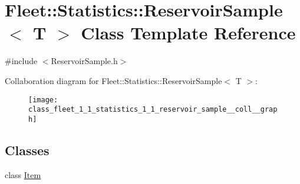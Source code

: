 \hypertarget{class_fleet_1_1_statistics_1_1_reservoir_sample}{}\section{Fleet\+:\+:Statistics\+:\+:Reservoir\+Sample$<$ T $>$ Class Template Reference}
\label{class_fleet_1_1_statistics_1_1_reservoir_sample}


{\ttfamily \#include $<$Reservoir\+Sample.\+h$>$}



Collaboration diagram for Fleet\+:\+:Statistics\+:\+:Reservoir\+Sample$<$ T $>$\+:
\nopagebreak
\begin{figure}[H]
\begin{center}
\leavevmode
\texttt{[image: class\_fleet\_1\_1\_statistics\_1\_1\_reservoir\_sample\_\_coll\_\_graph]}
\end{center}
\end{figure}
\subsection*{Classes}
\begin{DoxyCompactItemize}
\item 
class \hyperlink{class_fleet_1_1_statistics_1_1_reservoir_sample_1_1_item}{Item}
\end{DoxyCompactItemize}
